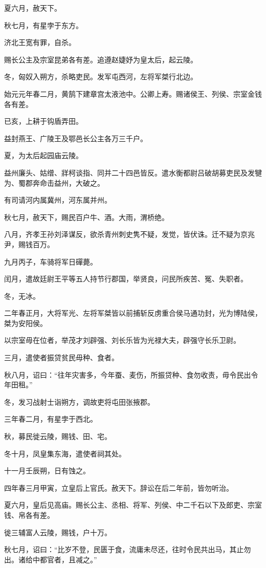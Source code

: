 \documentclass[]{article}
\begin{document}
夏六月，赦天下。

秋七月，有星孛于东方。

济北王宽有罪，自杀。

赐长公主及宗室昆弟各有差。追遵赵婕妤为皇太后，起云陵。

冬，匈奴入朔方，杀略吏民。发军屯西河，左将军桀行北边。

始元元年春二月，黄鹄下建章宫太液池中。公卿上寿。赐诸侯王、列侯、宗室金钱各有差。

已亥，上耕于钩盾弄田。

益封燕王、广陵王及鄂邑长公主各万三千户。

夏，为太后起园庙云陵。

益州廉头、姑缯、牂柯谈指、同并二十四邑皆反。遣水衡都尉吕破胡募吏民及发犍为、蜀郡奔命击益州，大破之。

有司请河内属冀州，河东属并州。

秋七月，赦天下，赐民百户牛、酒。大雨，渭桥绝。

八月，齐孝王孙刘泽谋反，欲杀青州刺史隽不疑，发觉，皆伏诛。迁不疑为京兆尹，赐钱百万。

九月丙子，车骑将军日磾薨。

闰月，遣故廷尉王平等五人持节行郡国，举贤良，问民所疾苦、冤、失职者。

冬，无冰。

二年春正月，大将军光、左将军桀皆以前捕斩反虏重合侯马通功封，光为博陆侯，桀为安阳侯。

以宗室毋在位者，举茂才刘辟强、刘长乐皆为光禄大夫，辟强守长乐卫尉。

三月，遣使者振贷贫民毋种、食者。

秋八月，诏曰：``往年灾害多，今年蚕、麦伤，所振贷种、食勿收责，毋令民出令年田租。''

冬，发习战射士诣朔方，调故吏将屯田张掖郡。

三年春二月，有星孛于西北。

秋，募民徙云陵，赐钱、田、宅。

冬十月，凤皇集东海，遣使者祠其处。

十一月壬辰朔，日有蚀之。

四年春三月甲寅，立皇后上官氏。赦天下。辞讼在后二年前，皆勿听治。

夏六月，皇后见高庙。赐长公主、丞相、将军、列侯、中二千石以下及郎吏、宗室钱、帛各有差。

徙三辅富人云陵，赐钱，户十万。

秋七月，诏曰：``比岁不登，民匮于食，流庸未尽还，往时令民共出马，其止勿出。诸给中都官者，且减之。''
\end{document}
